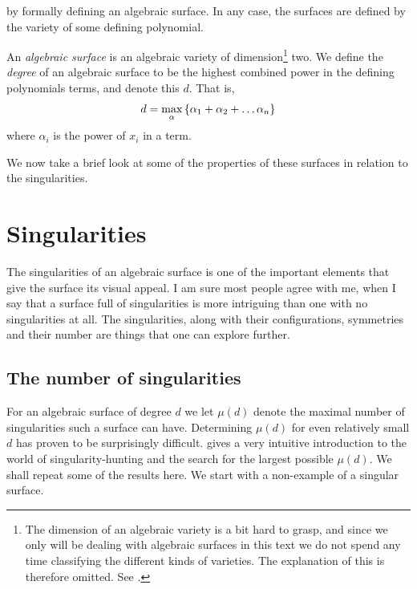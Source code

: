 \documentclass{article}
\begin{document}
    by formally defining an algebraic surface. In any case, the surfaces are
    defined by the variety of some defining polynomial.
    \begin{definition}
        An \emph{algebraic surface} is an algebraic variety of
        dimension\footnote{The dimension of an algebraic variety is a bit hard
            to grasp, and since we only will be dealing with algebraic surfaces
            in this text we do not spend any time classifying the different
        kinds of varieties. The explanation of this is therefore omitted. See
    \cite{Dim16}.}
            two.  We define the \emph{degree}
            of an algebraic surface to be the highest combined power in the
            defining polynomials terms, and denote this $d$.  That is,
        \begin{equation}
            \notag
            d = \max_{\alpha}\left\{ \alpha_1 + \alpha_2 + \ldots \alpha_n \right\}
        \end{equation}
        where $\alpha_i$ is the power of $x_i$ in a term.
    \end{definition}
    We now take a brief look at some of the properties of these surfaces in
    relation to the singularities.
    
    \section{Singularities}
    \label{sec:singularities}
    The singularities of an algebraic surface is one of the important elements
    that give the surface its visual appeal. I am sure most people agree with
    me, when I say that a surface full of singularities is more intriguing than
    one with no singularities at all. The singularities, along with their
    configurations, symmetries and their number are things that one can explore
    further.
     
    \subsection{The number of singularities}
    \label{sub:the_number_of_singularities}

    For an algebraic surface of degree $d$ we let
    $\mu(d)$ denote the maximal
    number of singularities such a surface can have.  Determining $\mu(d)$ for
    even relatively small $d$ has proven to be surprisingly difficult.
    \cite{Lab14} gives a very intuitive introduction to the world of
    singularity-hunting and the search for the largest possible $\mu(d)$. We
    shall repeat some of the results here. We start with a non-example of a
    singular surface.
    
\end{document}
